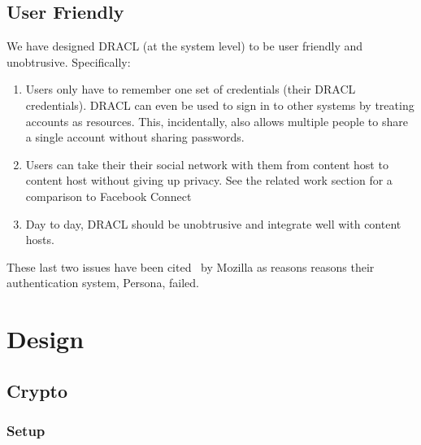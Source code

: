\documentclass[pdftex,12pt,a4papaer]{report}
\begin{document}
\section{User Friendly}

We have designed DRACL (at the system level) to be user friendly and
unobtrusive. Specifically:

\begin{enumerate}
  \item Users only have to remember one set of credentials (their DRACL
    credentials). DRACL can even be used to sign in to other systems by treating
    accounts as resources. This, incidentally, also allows multiple people to share
    a single account without sharing passwords.
  \item Users can take their their social network with them from content host to
    content host without giving up privacy. See the related work section for a
    comparison to Facebook Connect\texttrademark~\cite{facebook-connect}
  \item Day to day, DRACL should be unobtrusive and integrate well with content
    hosts.
\end{enumerate}

These last two issues have been cited~\cite{persona-fail} by Mozilla as reasons
reasons their authentication system, Persona, failed.

\chapter{Design}

\section{Crypto}

\subsection{Setup}
\end{document}
